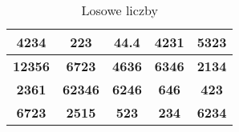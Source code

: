 \begin{table}[htbp]
\centering
\begin{tabular}{|c|c|c|c|c|}
\hline
\textbf{4234}  & \textbf{223}   & \textbf{44.4} & \textbf{4231} & \textbf{5323} \\ \hline
\textbf{12356} & \textbf{6723}  & \textbf{4636} & \textbf{6346} & \textbf{2134} \\ \hline
\textbf{2361}  & \textbf{62346} & \textbf{6246} & \textbf{646}  & \textbf{423}  \\ \hline
\textbf{6723}  & \textbf{2515}  & \textbf{523}  & \textbf{234}  & \textbf{6234} \\ \hline
\end{tabular}
\caption{Losowe liczby}
\label{tab:losowe liczby}
\end{table}